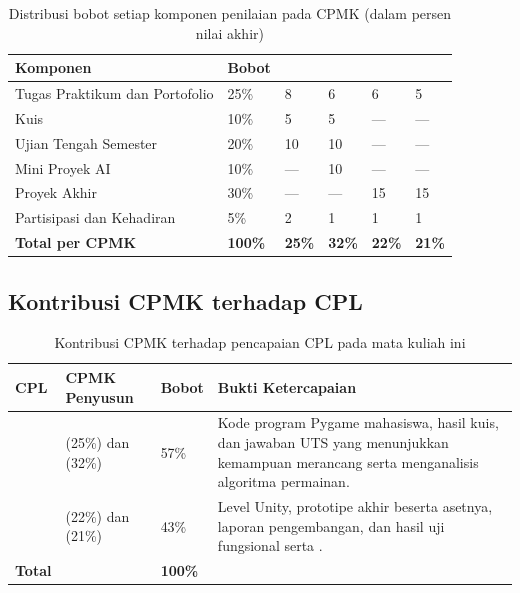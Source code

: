 \begin{table}[htbp]
\centering
\caption{Distribusi bobot setiap komponen penilaian pada CPMK (dalam persen nilai akhir)}
\label{tab:matriks-bobot}
\begin{tabularx}{\textwidth}{@{}L{4.6cm} C{1.8cm} C{1.7cm} C{1.7cm} C{1.7cm} C{1.7cm}@{}}
\toprule
\headrow \textbf{Komponen} & \textbf{Bobot} & \textbf{} & \textbf{} & \textbf{} & \textbf{} \\
\midrule
Tugas Praktikum dan Portofolio & 25\% & 8 & 6 & 6 & 5 \\
Kuis                           & 10\% & 5 & 5 & --- & --- \\
Ujian Tengah Semester          & 20\% & 10 & 10 & --- & --- \\
Mini Proyek AI                 & 10\% & --- & 10 & --- & --- \\
Proyek Akhir                   & 30\% & --- & --- & 15 & 15 \\
Partisipasi dan Kehadiran      & 5\%  & 2 & 1 & 1 & 1 \\
\midrule
\textbf{Total per CPMK}        & \textbf{100\%} & \textbf{25\%} & \textbf{32\%} & \textbf{22\%} & \textbf{21\%} \\
\bottomrule
\end{tabularx}
\end{table}

\subsection{Kontribusi CPMK terhadap CPL}

\begin{table}[htbp]
\centering
\caption{Kontribusi CPMK terhadap pencapaian CPL pada mata kuliah ini}
\label{tab:kontribusi-cpl}
\begin{tabularx}{\textwidth}{@{}L{2.4cm} L{6.4cm} C{2.4cm} Y@{}}
\toprule
\headrow \textbf{CPL} & \textbf{CPMK Penyusun} & \textbf{Bobot} & \textbf{Bukti Ketercapaian} \\
\midrule
{} &  (25\%) dan  (32\%) & 57\% &
Kode program Pygame mahasiswa, hasil kuis, dan jawaban UTS yang menunjukkan kemampuan merancang serta menganalisis algoritma permainan. \\
\addlinespace
{} &  (22\%) dan  (21\%) & 43\% &
Level Unity, prototipe akhir beserta asetnya, laporan pengembangan, dan hasil uji fungsional serta . \\
\midrule
\textbf{Total} & & \textbf{100\%} & \\
\bottomrule
\end{tabularx}
\end{table}

